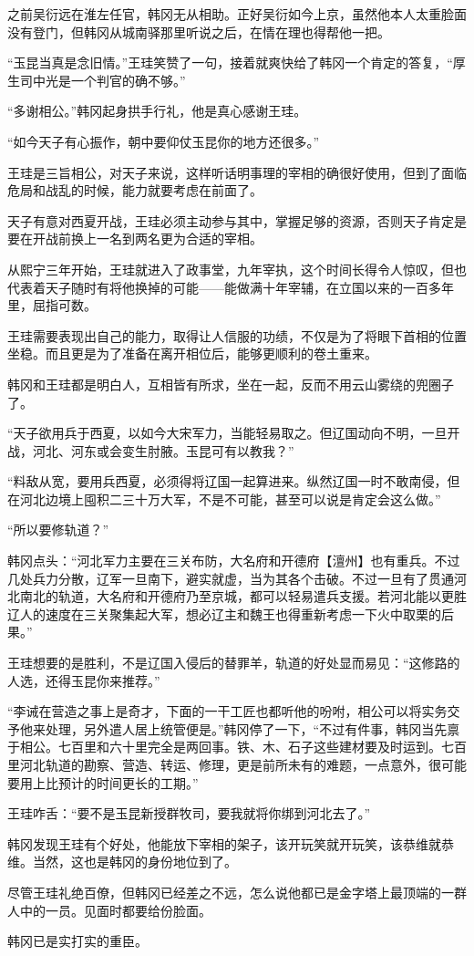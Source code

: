 之前吴衍远在淮左任官，韩冈无从相助。正好吴衍如今上京，虽然他本人太重脸面没有登门，但韩冈从城南驿那里听说之后，在情在理也得帮他一把。

“玉昆当真是念旧情。”王珪笑赞了一句，接着就爽快给了韩冈一个肯定的答复，“厚生司中光是一个判官的确不够。”

“多谢相公。”韩冈起身拱手行礼，他是真心感谢王珪。

“如今天子有心振作，朝中要仰仗玉昆你的地方还很多。”

王珪是三旨相公，对天子来说，这样听话明事理的宰相的确很好使用，但到了面临危局和战乱的时候，能力就要考虑在前面了。

天子有意对西夏开战，王珪必须主动参与其中，掌握足够的资源，否则天子肯定是要在开战前换上一名到两名更为合适的宰相。

从熙宁三年开始，王珪就进入了政事堂，九年宰执，这个时间长得令人惊叹，但也代表着天子随时有将他换掉的可能——能做满十年宰辅，在立国以来的一百多年里，屈指可数。

王珪需要表现出自己的能力，取得让人信服的功绩，不仅是为了将眼下首相的位置坐稳。而且更是为了准备在离开相位后，能够更顺利的卷土重来。

韩冈和王珪都是明白人，互相皆有所求，坐在一起，反而不用云山雾绕的兜圈子了。

“天子欲用兵于西夏，以如今大宋军力，当能轻易取之。但辽国动向不明，一旦开战，河北、河东或会变生肘腋。玉昆可有以教我？”

“料敌从宽，要用兵西夏，必须得将辽国一起算进来。纵然辽国一时不敢南侵，但在河北边境上囤积二三十万大军，不是不可能，甚至可以说是肯定会这么做。”

“所以要修轨道？”

韩冈点头：“河北军力主要在三关布防，大名府和开德府【澶州】也有重兵。不过几处兵力分散，辽军一旦南下，避实就虚，当为其各个击破。不过一旦有了贯通河北南北的轨道，大名府和开德府乃至京城，都可以轻易遣兵支援。若河北能以更胜辽人的速度在三关聚集起大军，想必辽主和魏王也得重新考虑一下火中取栗的后果。”

王珪想要的是胜利，不是辽国入侵后的替罪羊，轨道的好处显而易见：“这修路的人选，还得玉昆你来推荐。”

“李诫在营造之事上是奇才，下面的一干工匠也都听他的吩咐，相公可以将实务交予他来处理，另外遣人居上统管便是。”韩冈停了一下，“不过有件事，韩冈当先禀于相公。七百里和六十里完全是两回事。铁、木、石子这些建材要及时运到。七百里河北轨道的勘察、营造、转运、修理，更是前所未有的难题，一点意外，很可能要用上比预计的时间更长的工期。”

王珪咋舌：“要不是玉昆新授群牧司，要我就将你绑到河北去了。”

韩冈发现王珪有个好处，他能放下宰相的架子，该开玩笑就开玩笑，该恭维就恭维。当然，这也是韩冈的身份地位到了。

尽管王珪礼绝百僚，但韩冈已经差之不远，怎么说他都已是金字塔上最顶端的一群人中的一员。见面时都要给份脸面。

韩冈已是实打实的重臣。

